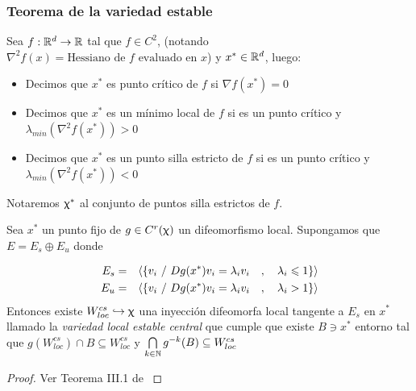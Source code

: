\subsubsection{Teorema de la variedad estable}

\begin{definition}
	Sea $f : {\mathbb{R}}^d \rightarrow {\mathbb{R}}$ tal que $f \in C^2$, (notando $\nabla^2 f (x) = \text{Hessiano de } f \text{ evaluado en } x$) y $x^* \in {\mathbb{R}}^d$, luego:
	
	\begin{itemize}
		\item Decimos que $x^*$ es punto cr\'itico de $f$  si $\nabla f(x^*) = 0$
		\item Decimos que $x^*$ es un m\'inimo local de $f$ si es un punto cr\'itico y $\lambda_{min} \left(\nabla ^2 f(x^*)\right) > 0$
		\item Decimos que $x^*$ es un punto silla estricto de $f$ si es un punto cr\'itico y $\lambda_{min} \left(\nabla ^2 f(x^*)\right) < 0$ 
	\end{itemize}
	
	Notaremos $\upchi^*$ al conjunto de puntos silla estrictos de $f$.
	
\end{definition}

\begin{theorem}
	\label{teo: variedad local estable central}
	Sea $x^*$ un punto fijo de $g \in C^{r}(\upchi)$ un difeomorfismo local. Supongamos que $E = E_s \oplus E_u$ donde 
	
	\begin{equation*}
	\begin{aligned}
	E_s & = & \langle \left\lbrace v_i \ / \ Dg(x^*)v_i = \lambda_i v_i \quad , \quad \lambda_i \leqslant 1\right\rbrace \rangle \\
	E_u & = & \langle \left\lbrace v_i \ / \ Dg(x^*)v_i = \lambda_i v_i \quad , \quad \lambda_i > 1\right\rbrace \rangle \\
	\end{aligned}
	\end{equation*}
	Entonces existe $W_{loc}^{cs} \hookrightarrow \upchi$ una inyecci\'on difeomorfa local tangente a $E_s$ en $x^*$ llamado la \textit{variedad local estable central} que cumple que existe $B \ni x^*$ entorno tal que $g\left(W_{loc}^{cs}\right) \cap B \subseteq W_{loc}^{cs}$ y $\bigcap\limits_{k \in {\mathbb{N}}}{g^{-k}(B)} \subseteq W_{loc}^{cs}$
\end{theorem}

\begin{proof}
	Ver Teorema III.1 de \cite{schub:1987}
\end{proof}

